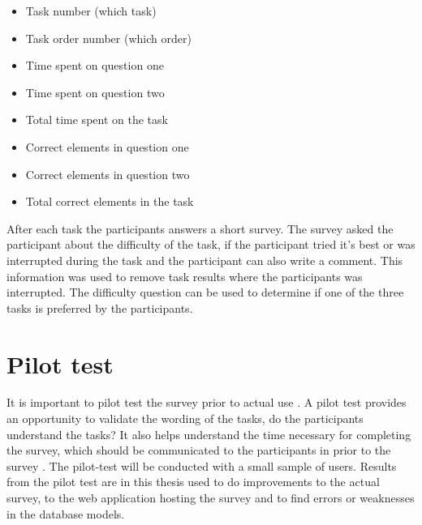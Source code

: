 \begin{itemize}
	\item Task number (which task)
	\item Task order number (which order)
	\item Time spent on question one 
	\item Time spent on question two
	\item Total time spent on the task
	\item Correct elements in question one
	\item Correct elements in question two
	\item Total correct elements in the task
\end{itemize}
\vspace{0.2cm}

After each task the participants answers a short survey. The survey asked the participant about the difficulty of the task, if the participant tried it's best or was interrupted during the task and the participant can also write a comment. This information was used to remove task results where the participants was interrupted. The difficulty question can be used to determine if one of the three tasks is preferred by the participants. 

\section{Pilot test}
It is important to pilot test the survey prior to actual use \citep{Ben2009}. A pilot test provides an opportunity to validate the wording of the tasks, do the participants understand the tasks? It also helps understand the time necessary for completing the survey, which should be communicated to the participants in prior to the survey \citep{Schade2015}. The pilot-test will be conducted with a small sample of users. Results from the pilot test are in this thesis used to do improvements to the actual survey, to the web application hosting the survey and to find errors or weaknesses in the database models.

